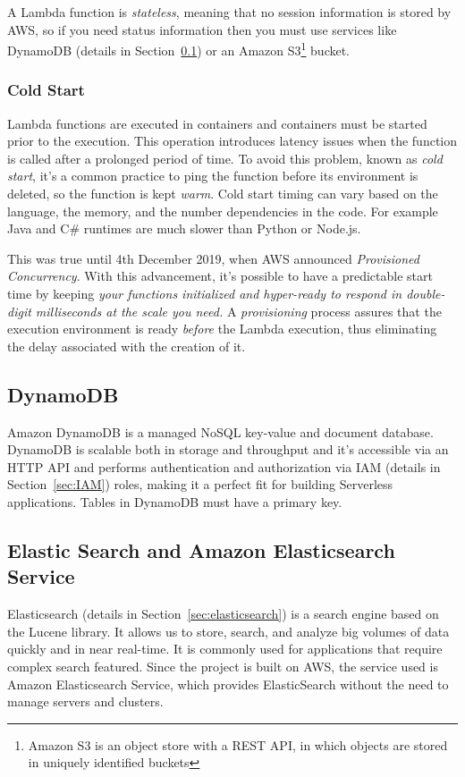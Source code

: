 A Lambda function is \textit{stateless}, meaning that no session information is
stored by AWS, so if you need status information then you must use services like
 DynamoDB (details in Section~\ref{sec:dynamo_db}) or an Amazon S3\footnote{Amazon S3 is an object store with a REST API, 
 in which objects are stored in uniquely identified buckets } bucket.

\subsubsection{Cold Start}
Lambda functions are executed in containers and containers must be started prior to the
execution\cite{8605777}. This operation introduces latency issues when the function is called
after a prolonged period of time.  To avoid this problem, known as \textit{cold start},
it's a common practice to ping the function before its environment is deleted, so the function
is kept \textit{warm}. 
Cold start timing can vary based on the language, the memory, and the number dependencies in the code.
For example Java and C\# runtimes are much slower than Python or Node.js.

This was true until 4th December 2019, when AWS announced \textit{Provisioned Concurrency}.
With this advancement, it's possible to have a predictable start time by keeping
\textit{your functions initialized and hyper-ready to respond in double-digit milliseconds at the scale you need.}\cite{coldstart}
A \textit{provisioning} process assures that the execution environment is ready \textit{before} the
Lambda execution, thus eliminating the delay associated with the creation of it. 

\subsection{DynamoDB}
\label{sec:dynamo_db}
Amazon DynamoDB is a managed NoSQL key-value and document database.
DynamoDB is scalable both in storage and throughput and it's
accessible via an HTTP API and performs authentication and
authorization via IAM (details in Section~\ref{sec:IAM}) roles, making it a perfect fit for building
Serverless applications. Tables in DynamoDB must have a primary key.


\subsection{Elastic Search and Amazon Elasticsearch Service }
\label{sec:elastic}
Elasticsearch (details in Section~\ref{sec:elasticsearch}) is a search engine based on the Lucene library.  It
allows us to store, search, and analyze big volumes of data quickly and
in near real-time. It is commonly used for applications that require
complex search featured.  Since the project is built on AWS, the
service used is Amazon Elasticsearch Service, which provides ElasticSearch
without the need to manage servers and clusters.


